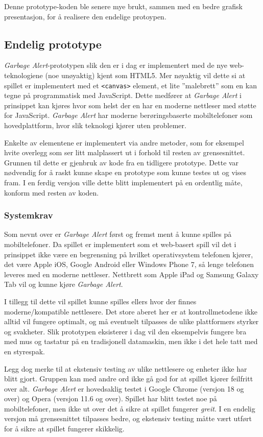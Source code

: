 Denne prototype-koden ble senere mye brukt, sammen med en bedre grafisk
presentasjon, for å realisere den endelige protoypen.

\subsection{Endelig prototype}
\emph{Garbage Alert}-prototypen slik den er i dag er implementert med de nye
web-teknologiene (noe unøyaktig) kjent som HTML5. Mer nøyaktig vil dette
si at spillet er implementert med et \texttt{<canvas>} element, et lite
''malebrett'' som en kan tegne på programmatisk med JavaScript. Dette
medfører at \emph{Garbage Alert} i prinsippet kan kjøres hvor som helst der en
har en moderne nettleser med støtte for JavaScript. \emph{Garbage Alert} har
moderne berøringsbaserte mobiltelefoner som hovedplattform, hvor slik
teknologi kjører uten problemer.

Enkelte av elementene er implementert via andre metoder, som for
eksempel hvite overlegg som ser litt malplassert ut i forhold til resten
av grensesnittet. Grunnen til dette er gjenbruk av kode fra en tidligere
prototype. Dette var nødvendig for å raskt kunne skape en prototype som
kunne testes ut og vises fram. I en ferdig versjon ville dette blitt
implementert på en ordentlig måte, konform med resten av koden.


\subsubsection{Systemkrav}
Som nevnt over er \emph{Garbage Alert} først og fremst ment å kunne spilles på
mobiltelefoner.
Da spillet er implementert som et web-basert spill vil det i prinsippet
ikke være en begrensning på hvilket operativsystem telefonen kjører, det
være Apple iOS, Google Android eller Windows Phone 7, så lenge telefonen
leveres med en moderne nettleser. Nettbrett som Apple iPad og Samsung
Galaxy Tab vil og kunne kjøre \emph{Garbage Alert}.

I tillegg til dette vil spillet kunne spilles ellers hvor der finnes
moderne/kompatible nettlesere. Det store aberet her er at
kontrollmetodene ikke alltid vil fungere optimalt, og må eventuelt
tilpasses de ulike plattformers styrker og svakheter. Slik prototypen
eksisterer i dag vil den eksempelvis fungere bra med mus og tastatur på
en tradisjonell datamaskin, men ikke i det hele tatt med en styrespak.

Legg dog merke til at ekstensiv testing av ulike nettlesere og enheter
ikke har blitt gjort. Gruppen kan med andre ord ikke gå god for at
spillet kjører feilfritt over alt. \emph{Garbage Alert} er hovedsaklig testet i
Google Chrome (versjon 18 og over) og Opera (versjon 11.6 og over).
Spillet har blitt testet noe på mobiltelefoner, men ikke ut over det å
sikre at spillet fungerer \emph{greit}. I en endelig versjon må
grensesnittet tilpasses bedre, og ekstensiv testing måtte vært utført
for å sikre at spillet fungerer skikkelig.


